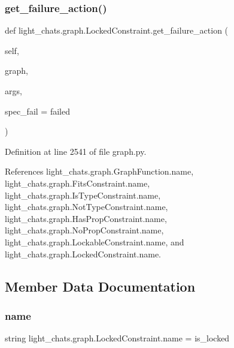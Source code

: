 \subsubsection{\texorpdfstring{get\+\_\+failure\+\_\+action()}{get\_failure\_action()}}
{\footnotesize\ttfamily def light\+\_\+chats.\+graph.\+Locked\+Constraint.\+get\+\_\+failure\+\_\+action (\begin{DoxyParamCaption}\item[{}]{self,  }\item[{}]{graph,  }\item[{}]{args,  }\item[{}]{spec\+\_\+fail = {\ttfamily \textquotesingle{}failed\textquotesingle{}} }\end{DoxyParamCaption})}



Definition at line 2541 of file graph.\+py.



References light\+\_\+chats.\+graph.\+Graph\+Function.\+name, light\+\_\+chats.\+graph.\+Fits\+Constraint.\+name, light\+\_\+chats.\+graph.\+Is\+Type\+Constraint.\+name, light\+\_\+chats.\+graph.\+Not\+Type\+Constraint.\+name, light\+\_\+chats.\+graph.\+Has\+Prop\+Constraint.\+name, light\+\_\+chats.\+graph.\+No\+Prop\+Constraint.\+name, light\+\_\+chats.\+graph.\+Lockable\+Constraint.\+name, and light\+\_\+chats.\+graph.\+Locked\+Constraint.\+name.



\subsection{Member Data Documentation}
\mbox{\label{classlight__chats_1_1graph_1_1LockedConstraint_a2685038006754564877b03277d436c7f}} 
\subsubsection{\texorpdfstring{name}{name}}
{\footnotesize\ttfamily string light\+\_\+chats.\+graph.\+Locked\+Constraint.\+name = \textquotesingle{}is\+\_\+locked\textquotesingle{}\hspace{0.3cm}{\ttfamily [static]}}



